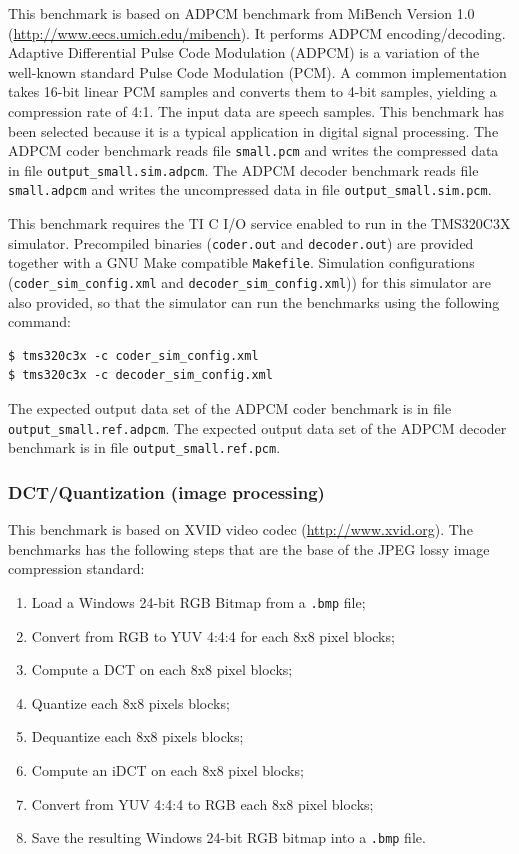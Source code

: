 This benchmark is based on ADPCM benchmark from MiBench Version 1.0 (\url{http://www.eecs.umich.edu/mibench}).
It performs ADPCM encoding/decoding. 
Adaptive Differential Pulse Code Modulation (ADPCM) is a variation of the well-known standard Pulse Code Modulation (PCM). 
A common implementation takes 16-bit linear PCM samples and converts them to 4-bit samples, yielding a compression rate of 4:1. 
The input data are speech samples.
This benchmark has been selected because it is a typical application in digital signal processing.
The ADPCM coder benchmark reads file \texttt{small.pcm} and writes the compressed data in file \texttt{output\_small.sim.adpcm}.
The ADPCM decoder benchmark reads file \texttt{small.adpcm} and writes the uncompressed data in file \texttt{output\_small.sim.pcm}.

This benchmark requires the TI C I/O service enabled to run in the TMS320C3X simulator.
Precompiled binaries (\texttt{coder.out} and \texttt{decoder.out}) are provided together with a GNU Make compatible \texttt{Makefile}.
Simulation configurations (\texttt{coder\_sim\_config.xml} and \texttt{decoder\_sim\_config.xml})) for this simulator are also provided, so that the simulator can run the benchmarks using the following command:

\begin{verbatim}
$ tms320c3x -c coder_sim_config.xml
$ tms320c3x -c decoder_sim_config.xml
\end{verbatim}

The expected output data set of the ADPCM coder benchmark is in file \texttt{output\_small.ref.adpcm}.
The expected output data set of the ADPCM decoder benchmark is in file \texttt{output\_small.ref.pcm}.

\subsubsection{DCT/Quantization (image processing)}

This benchmark is based on XVID video codec (\url{http://www.xvid.org}).
The benchmarks has the following steps that are the base of the JPEG lossy image compression standard:
\begin{enumerate}
\item Load a Windows 24-bit RGB Bitmap from a \texttt{.bmp} file;
\item Convert from RGB to YUV 4:4:4 for each 8x8 pixel blocks;
\item Compute a DCT on each 8x8 pixel blocks;
\item Quantize each 8x8 pixels blocks;
\item Dequantize each 8x8 pixels blocks;
\item Compute an iDCT on each 8x8 pixel blocks;
\item Convert from YUV 4:4:4 to RGB each 8x8 pixel blocks;
\item Save the resulting Windows 24-bit RGB bitmap into a \texttt{.bmp} file.
\end{enumerate}

